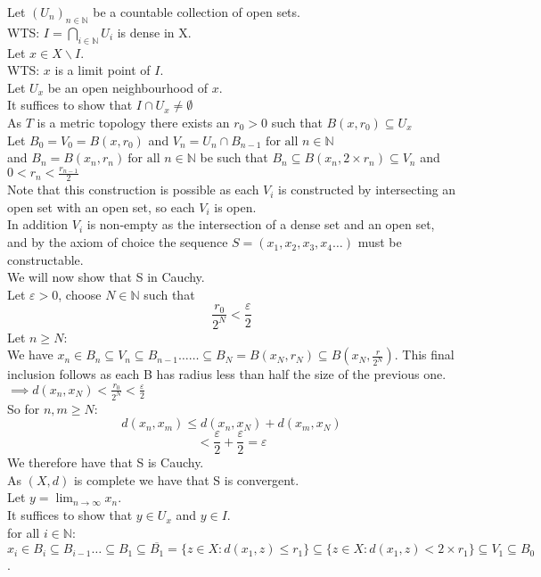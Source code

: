 \documentclass{report}
\begin{document}
Let $(U_n)_{n\in \mathbb{N}}$ be a countable collection of open sets.\\
WTS:  $I=\bigcap_{i\in \mathbb{N}}{U_i}$ is dense in X.\\
Let $x\in X\backslash I$.\\
WTS: $x$ is a limit point of $I$.\\
Let $U_x$ be an open neighbourhood of $x$.\\
It suffices to show that $I\cap U_x \neq \emptyset$\\
As $T$ is a metric topology there exists an $r_0>0$ such that $B(x,r_0)\subseteq U_x$\\
Let $B_0=V_0=B(x,r_0)$ and $V_n=U_n\cap B_{n-1}\text{ for all } n \in \mathbb{N}$\\ and $B_n=B(x_n,r_n)\ \text{for all } n \in \mathbb{N}$ be such that $B_n\subseteq B(x_n,2\times r_n) \subseteq V_n$ and $0<r_n<\frac{r_{n-1}}{2}$\\
Note that this construction is possible as each $V_i$ is constructed by intersecting an open set with an open set, so each $V_i$ is open.\\
In addition $V_i$ is non-empty as the intersection of a dense set and an open set, and by the axiom of choice the sequence $S = (x_1,x_2,x_3,x_4 \ldots)$ must be constructable.\\
We will now show that S in Cauchy.\\
Let $\varepsilon > 0$, choose $N\in \mathbb{N}$ such that $$\frac{r_0}{2^{N}} < \frac{\varepsilon}{2}$$
Let $n \geq N$:\\
We have $x_n\in B_n \subseteq V_n \subseteq B_{n-1} \ldots \ldots \subseteq B_{N}=B(x_{N},r_{N})\subseteq B(x_{N},\frac{r}{2^{N}})$. This final inclusion follows as each B has radius less than half the size of the previous one.\\
$\implies d(x_n,x_N) < \frac{r_0}{2^N} < \frac{\varepsilon}{2}$\\
So for $n,m\geq N$:
$$d(x_n,x_m)\leq d(x_n,x_N)+d(x_m,x_N)$$
$$< \frac{\varepsilon}{2}+\frac{\varepsilon}{2}=\varepsilon$$
We therefore have that S is Cauchy.\\
As $(X,d)$ is complete we have that S is convergent.\\
Let $y = \lim_{n\rightarrow \infty} x_n$.\\
It suffices to show that $y\in U_x$ and $y\in I$.\\
for all $i \in \mathbb{N}$:
$x_i\in B_i \subseteq B_{i-1} \ldots \subseteq B_1\subseteq \overline{B_1} = \{z \in X: d(x_1,z) \leq r_1\} \subseteq \{z \in X: d(x_1,z) < 2\times r_1\} \subseteq V_1\subseteq B_0$.\\
\end{document}
